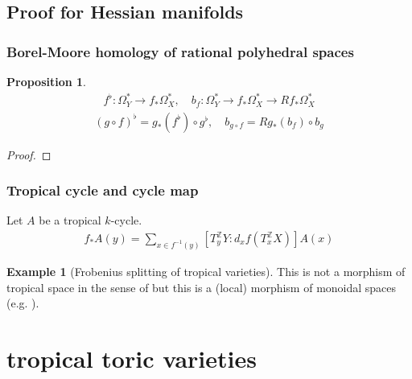 \documentclass[a4paper,dvipdfmx,reqno,12pt]{amsart}
\theoremstyle{definition}
\newtheorem{Eg}[Thm]{Example}
\newtheorem{Prop}[Thm]{Proposition}
\newcommand{\Z}{\mathbb{Z}}%
\numberwithin{equation}{section}
\begin{document}
\subsection{Proof for Hessian manifolds}


\subsubsection{Borel-Moore homology of rational polyhedral spaces}






\begin{Prop}

  \begin{align}
    f^{\flat}:\Omega_Y^{*}\to f_*\Omega_X^{*}, \quad b_f: \Omega_Y^{*}\to f_*\Omega_X^{*} \to Rf_*\Omega_X^{*}
  \end{align}
  \begin{align}
    (g\circ f)^{\flat}=g_*(f^{\flat})\circ g^{\flat},
    \quad b_{g\circ f}=Rg_*(b_f)\circ b_g
  \end{align}
\end{Prop}
\begin{proof}

\end{proof}




\subsubsection{Tropical cycle and cycle map}

Let $A$ be a tropical $k$-cycle.
\cite[Definition 3.6]{gross2019sheaftheoretic}
\begin{align}
  f_*A(y)=\sum_{x\in f^{-1}(y)}[T^{\Z}_yY:d_xf(T^{\Z}_x X)]A(x)
\end{align}

\begin{Eg}[Frobenius splitting of tropical varieties]

  This is not a morphism of tropical space in the sense of
  \cite{gross2019sheaftheoretic} but this is a (local) morphism
  of monoidal spaces (e.g. \cite[II Definition 1.1.1]{MR3838359}).

\end{Eg}

\section{tropical toric varieties} \label{sec: toric}
\end{document}
